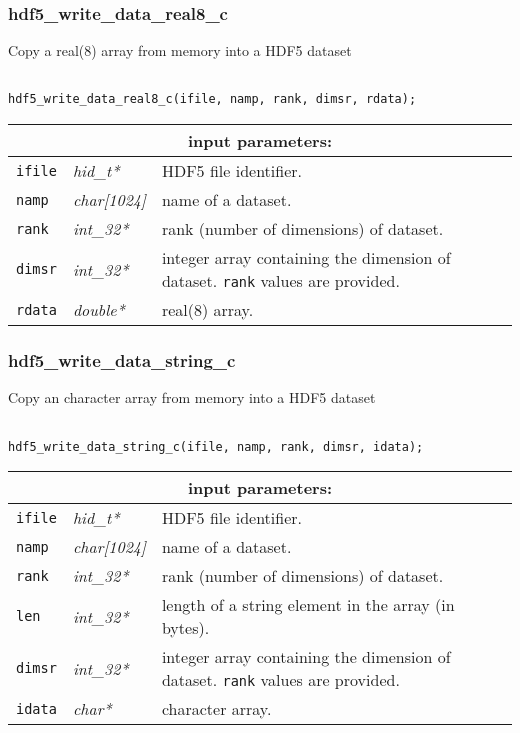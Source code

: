 \subsubsection{hdf5\_write\_data\_real8\_c}

Copy a real(8) array from memory into a HDF5 dataset

\begin{verbatim}

hdf5_write_data_real8_c(ifile, namp, rank, dimsr, rdata);
\end{verbatim}

\noindent
\begin{tabular}{|p{1.5cm}|p{2cm}|p{11cm}|}
\hline
\multicolumn{3}{|c|}{\bf input parameters:} \\
\hline
{\tt ifile} & {\it hid\_t*} & HDF5 file identifier. \\
\hline
{\tt namp} & {\it char[1024]} & name of a dataset. \\
\hline
{\tt rank} & {\it int\_32*} & rank (number of dimensions) of dataset. \\
\hline
{\tt dimsr} & {\it int\_32*} & integer array containing the dimension of dataset. {\tt rank} values are provided. \\
\hline
{\tt rdata} & {\it double*} & real(8) array. \\
\hline
\end{tabular}

\subsubsection{hdf5\_write\_data\_string\_c}

Copy an character array from memory into a HDF5 dataset

\begin{verbatim}

hdf5_write_data_string_c(ifile, namp, rank, dimsr, idata);
\end{verbatim}

\noindent
\begin{tabular}{|p{1.5cm}|p{2cm}|p{11cm}|}
\hline
\multicolumn{3}{|c|}{\bf input parameters:} \\
\hline
{\tt ifile} & {\it hid\_t*} & HDF5 file identifier. \\
\hline
{\tt namp} & {\it char[1024]} & name of a dataset. \\
\hline
{\tt rank} & {\it int\_32*} & rank (number of dimensions) of dataset. \\
\hline
{\tt len} & {\it int\_32*} & length of a string element in the array (in bytes). \\
\hline
{\tt dimsr} & {\it int\_32*} & integer array containing the dimension of dataset. {\tt rank} values are provided. \\
\hline
{\tt idata} & {\it char*} & character array. \\
\hline
\end{tabular}

